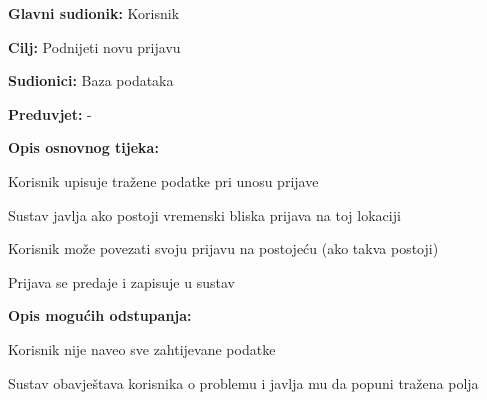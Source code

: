 					\noindent {}
					\begin{packed_item}
	
						\item \textbf{Glavni sudionik: }Korisnik
						\item  \textbf{Cilj:} Podnijeti novu prijavu
						\item  \textbf{Sudionici:} Baza podataka
						\item  \textbf{Preduvjet:} -
						\item  \textbf{Opis osnovnog tijeka:}
						
						\item[] \begin{packed_enum}
	
							\item Korisnik upisuje tražene podatke pri unosu prijave 
							\item Sustav javlja ako postoji vremenski bliska prijava na toj lokaciji
							\item Korisnik može povezati svoju prijavu na postojeću (ako takva postoji)
							\item Prijava se predaje i zapisuje u sustav
						\end{packed_enum}
						
						\item  \textbf{Opis mogućih odstupanja:}
						
						\item[] \begin{packed_item}
	
							\item[1.a] Korisnik nije naveo sve zahtijevane podatke
							\item[] \begin{packed_enum}
								
								\item Sustav obavještava korisnika o problemu i javlja mu da popuni tražena polja
								
							\end{packed_enum}
							
						\end{packed_item}
					\end{packed_item}
					
					\pagebreak
					
